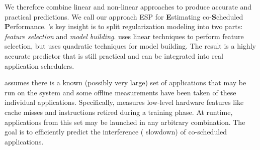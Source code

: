 We therefore combine linear and non-linear approaches to produce
accurate and practical predictions.  We call our approach ESP for
\textbf{E}stimating co-\textbf{S}cheduled \textbf{P}erformance.
\SYSTEMESP{}'s key insight is to split regularization modeling into two
parts: \emph{feature selection} and \emph{model building}.  \SYSTEMESP{}
uses linear techniques to perform feature selection, but uses
quadratic techniques for model building.  The result is a highly
accurate predictor that is still practical and can be integrated into
real application schedulers.

\SYSTEMESP{} assumes there is a known (possibly very large) set of
applications that may be run on the system and some offline
measurements have been taken of these individual applications.
Specifically, \SYSTEMESP{} measures low-level hardware features like
cache misses and instructions retired during a training phase.  At
runtime, applications from this set may be launched in any arbitrary
combination.  The goal is to efficiently predict the interference (\ie
slowdown) of co-scheduled applications.

